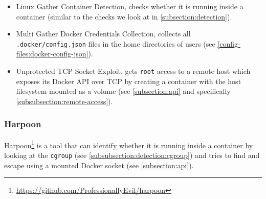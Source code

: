 \begin{itemize}
    \item Linux Gather Container Detection\cite{Metasploit-Linux-Gather-Container-Detection}, checks whether it is running inside a container (similar to the checks we look at in \autoref{subsection:detection}).
    \item Multi Gather Docker Credentials Collection\cite{Docker-Credentials-Metasploit}, collects all \lstinline{.docker/config.json} files in the home directories of users (see \autoref{config-files:docker-config-json}).
    \item Unprotected TCP Socket Exploit\cite{Metasploit-Unprotected-TCP-Socket}, gets \lstinline{root} access to a remote host which exposes its Docker API over TCP by creating a container with the host filesystem mounted as a volume (see \autoref{subsection:api} and specifically \autoref{subsubsection:remote-access}).
\end{itemize}

\subsubsection{Harpoon}
Harpoon\footnote{\url{https://github.com/ProfessionallyEvil/harpoon}} is a tool that can identify whether it is running inside a container by looking at the \lstinline{cgroup} (see \autoref{subsubsection:detection:cgroup}) and tries to find and escape using a mounted Docker socket (see \autoref{subsection:api}).
